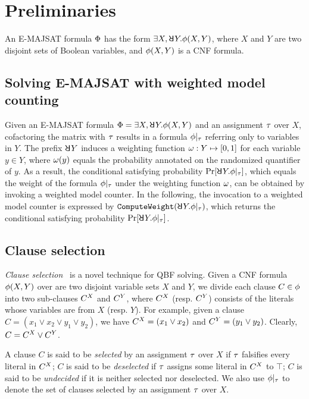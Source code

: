 \section{Preliminaries}
\label{sect:erssat-preliminaries}

An E-MAJSAT formula $\Phi$ has the form $\exists X,\random{} Y.\pf(X,Y)$,
where $X$ and $Y$ are two disjoint sets of Boolean variables,
and $\phi(X,Y)$ is a CNF formula.

\subsection{Solving E-MAJSAT with weighted model counting}
Given an E-MAJSAT formula $\Qf=\exists X,\random{} Y.\pf(X,Y)$ and an assignment $\tau$ over $X$,
cofactoring the matrix with $\tau$ results in a formula $\phi|_{\tau}$ referring only to variables in $Y$.
The prefix $\random{} Y$ induces a weighting function $\omega: Y \mapsto [0,1]$ for each variable $y \in Y$,
where $\omega(y)$ equals the probability annotated on the randomized quantifier of $y$.
As a result, the conditional satisfying probability $\spb{\random{} Y.\pcf{\pf}{\as}}$,
which equals the weight of the formula $\phi|_{\tau}$ under the weighting function $\omega$,
can be obtained by invoking a weighted model counter.
In the following,
the invocation to a weighted model counter is expressed by $\mathtt{ComputeWeight}(\random{} Y.\pcf{\pf}{\as})$, which returns the conditional satisfying probability $\spb{\random{} Y.\pcf{\pf}{\as}}$.

\subsection{Clause selection}
\label{sect:erssat-clause-select}

\textit{Clause selection}~\cite{Janota2015,Rabe2015} is a novel technique for QBF solving.
Given a CNF formula $\phi(X,Y)$ over are two disjoint variable sets $X$ and $Y$,
we divide each clause $C\in\phi$ into two sub-clauses $C^X$ and $C^Y$,
where $C^X$ (resp. $C^Y$) consists of the literals whose variables are from $X$ (resp. $Y$).
For example, given a clause $C=(x_1 \lor x_2 \lor y_1 \lor y_2)$,
we have $C^X=(x_1 \lor x_2)$ and $C^Y=(y_1 \lor y_2)$.
Clearly, $C=C^X\lor C^Y$.

A clause $C$ is said to be \textit{selected} by an assignment $\tau$ over $X$ if $\tau$ falsifies every literal in $C^X$;
$C$ is said to be \textit{deselected} if $\tau$ assigns some literal in $C^X$ to $\top$;
$C$ is said to be \textit{undecided} if it is neither selected nor deselected.
We also use $\phi|_{\tau}$ to denote the set of clauses selected by an assignment $\tau$ over $X$.

